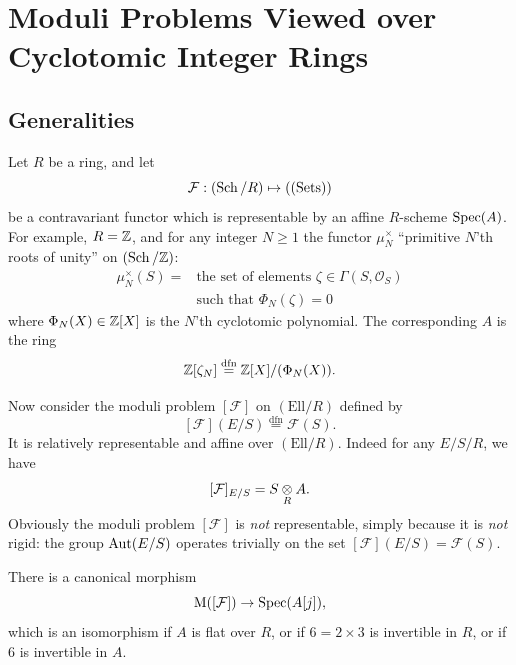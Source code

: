 \chapter{Moduli Problems Viewed over Cyclotomic Integer Rings}
\label{ch:09}

\section{Generalities}
\label{sec:9.1}

\kmitem\label{item:9.1.1}
Let $R$ be a ring, and let
\begin{equation}\label{eq:9.1.1.1}
\mathcal{F} : (\operatorname{Sch}/R) \mapsto ((\mathrm{Sets}))
\end{equation}
be a contravariant functor which is representable by an affine $R$-scheme $\operatorname{Spec}(A)$. For example, $R = \mathbb{Z}$, and for any integer $N \ge 1$ the functor $\mu_N^\times$ ``primitive $N$'th roots of unity'' on $(\operatorname{Sch}/\mathbb{Z})$:
\[
\begin{aligned}
\mu_N^\times(S) = {} & \text{the set of elements } \zeta \in \Gamma(S, \mathcal{O}_S) \\
& \text{such that } \Phi_N(\zeta) = 0
\end{aligned}
\]
where $\Phi_N(X) \in \mathbb{Z}[X]$ is the $N$'th cyclotomic polynomial. The corresponding $A$ is the ring
\[
\mathbb{Z}[\zeta_N] \overset{\mathrm{dfn}}{=} \mathbb{Z}[X]/(\Phi_N(X)) .
\]

\kmitem\label{item:9.1.2}
Now consider the moduli problem $[\mathcal{F}]$ on $(\mathrm{Ell}/R)$ defined by
\begin{equation}\label{eq:9.1.2.1}
[\mathcal{F}](E/S) \overset{\mathrm{dfn}}{=} \mathcal{F}(S) .
\end{equation}
It is relatively representable and affine over $(\mathrm{Ell}/R)$. Indeed for any $E/S/R$, we have
\begin{equation}\label{eq:9.1.2.2}
[\mathcal{F}]_{E/S} = S \underset{R}{\otimes} A .
\end{equation}
Obviously the moduli problem $[\mathcal{F}]$ is \emph{not} representable, simply because it is \emph{not} rigid: the group $\operatorname{Aut}(E/S)$ operates trivially on the set $[\mathcal{F}](E/S) = \mathcal{F}(S)$.

\begin{kprop}\label{prop:9.1.3}
There is a canonical morphism
\[
\mathrm{M}([\mathcal{F}]) \to \operatorname{Spec}(A[j]) ,
\]
which is an isomorphism if $A$ is flat over $R$, or if $6 = 2 \times 3$ is invertible in $R$, or if $6$ is invertible in $A$.
\end{kprop}

